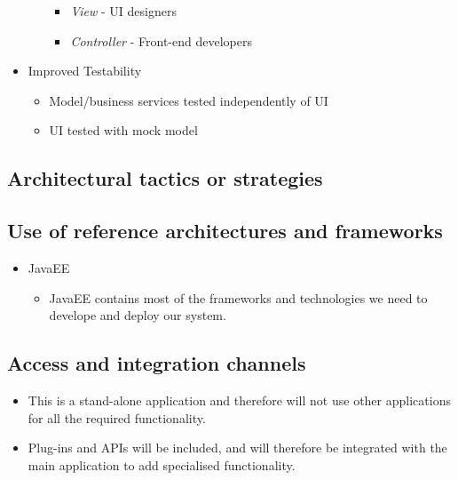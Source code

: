 \documentclass[a4paper,12pt]{article}
\begin{document}
\begin{itemize}
\begin{itemize}
\begin{itemize}
						\item \textit{View} - UI designers
						\item \textit{Controller} - Front-end developers
					\end{itemize}
			\end{itemize}
		\item Improved Testability
			\begin{itemize}
				\item Model/business services tested independently of UI
				\item UI tested with mock model
			\end{itemize}
	\end{itemize}


\subsection{Architectural tactics or strategies}
\subsection{Use of reference architectures and frameworks}
\begin{itemize}

\item JavaEE
	\begin{itemize}
		\item JavaEE contains most of the frameworks and technologies we need to develope and deploy our system.
	\end{itemize}
\end{itemize}

\subsection{Access and integration channels}
	\begin{itemize}
		\item This is a stand-alone application and therefore will not use other applications for all the required functionality.
		\item Plug-ins and APIs will be included, and will therefore be integrated with the main application to add specialised 				functionality. 
	\end{itemize}
\end{document}
